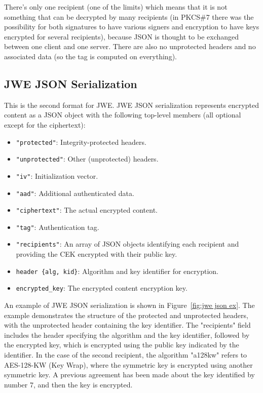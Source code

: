 There’s only one recipient (one of the limits) which means that it is
not something that can be decrypted by many recipients (in PKCS\#7
there was the possibility for both signatures to have various signers
and encryption to have keys encrypted for several recipients), because
JSON is thought to be exchanged between one client and one server.
There are also no unprotected headers and no associated data (so the
tag is computed on everything).

\subsection{JWE JSON Serialization}

This is the second format for JWE. JWE JSON serialization represents
encrypted content as a JSON object with the following top-level
members (all optional except for the ciphertext):

\begin{itemize}
    \item \texttt{"protected"}: Integrity-protected headers.
    \item \texttt{"unprotected"}: Other (unprotected) headers.
    \item \texttt{"iv"}: Initialization vector.
    \item \texttt{"aad"}: Additional authenticated data.
    \item \texttt{"ciphertext"}: The actual encrypted content.
    \item \texttt{"tag"}: Authentication tag.
    \item \texttt{"recipients"}: An array of JSON objects identifying
      each recipient and providing the CEK encrypted with their public
      key.
    \item \texttt{header \{alg, kid\}}: Algorithm and key identifier
      for encryption.
    \item \texttt{encrypted\_key}: The encrypted content encryption
      key.
\end{itemize}
An example of JWE JSON serialization is shown in 
Figure~\ref{fig:jwe json ex}.
The example demonstrates the structure of the protected and
unprotected headers, with the unprotected header containing the key
identifier. The "recipients" field includes the header specifying the
algorithm and the key identifier, followed by the encrypted key, which
is encrypted using the public key indicated by the identifier. In the
case of the second recipient, the algorithm "a128kw" refers to
AES-128-KW (Key Wrap), where the symmetric key is encrypted using
another symmetric key. A previous agreement has been made about the
key identified by number 7, and then the key is encrypted.

